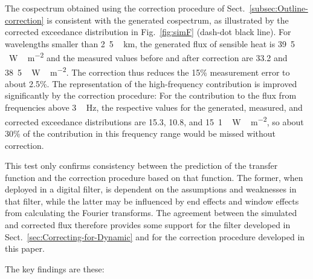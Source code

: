 \documentclass[amt, manuscript]{copernicus}
\begin{document}
The cospectrum obtained using the correction procedure of
Sect.~\ref{subsec:Outline-correction} is consistent with the generated
cospectrum, as illustrated by the corrected exceedance distribution in
Fig.~\ref{fig:simF} (dash-dot black line). For wavelengths smaller than
\unit{2.5\,km}, the generated flux of sensible heat is
\unit{39.5\,W\,m^{-2}} and the measured values before and after
correction are 33.2 and \unit{38.5\,W\,m^{-2}}. The correction thus
reduces the 15\% measurement error to about 2.5\%. The representation of
the high-frequency contribution is improved significantly by the
correction procedure: For the contribution to the flux from frequencies
above \unit{3\,Hz}, the respective values for the generated, measured,
and corrected exceedance distributions are 15.3, 10.8, and
\unit{15.1\,W\,m^{-2}}, so about 30\% of the contribution in this
frequency range would be missed without correction.

This test only confirms consistency between the prediction of the
transfer function and the correction procedure based on that function.
The former, when deployed in a digital filter, is dependent on the
assumptions and weaknesses in that filter, while the latter may be
influenced by end effects and window effects from calculating the
Fourier transforms. The agreement between the simulated and corrected
flux therefore provides some support for the filter developed in
Sect.~\ref{sec:Correcting-for-Dynamic} and for the correction procedure
developed in this paper.

\conclusions

The key findings are these:
\end{document}
